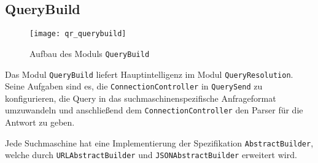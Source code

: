 
\subsection{QueryBuild}

\begin{figure}[htb]
	\centering
  	\texttt{[image: qr\_querybuild]}
  	\caption{Aufbau des Moduls \lstinline|QueryBuild|}
\end{figure}

Das Modul \lstinline|QueryBuild| liefert Hauptintelligenz im Modul \lstinline|QueryResolution|. Seine Aufgaben sind es, die \lstinline|ConnectionController| in \lstinline|QuerySend| zu konfigurieren, die Query in das suchmaschinenspezifische Anfrageformat umzuwandeln und anschließend dem \lstinline|ConnectionController| den Parser für die Antwort zu geben.

Jede Suchmaschine hat eine Implementierung der Spezifikation \lstinline|AbstractBuilder|, welche durch \lstinline|URLAbstractBuilder| und \lstinline|JSONAbstractBuilder| erweitert wird.